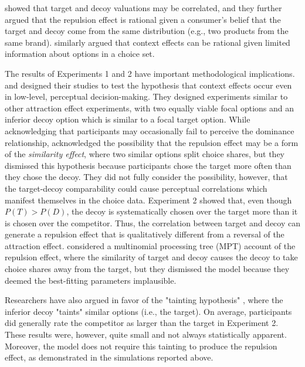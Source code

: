 \textcite{bhui2021rational} showed that target and decoy valuations may be correlated, and they further argued that the repulsion effect is rational given a consumer's belief that the target and decoy come from the same distribution (e.g., two products from the same brand). \textcite{bhui2024context} similarly argued that context effects can be rational given limited information about options in a choice set. 

The results of Experiments 1 and 2 have important methodological implications. \textcite{trueblood2013not} and \textcite{spektorWhenGoodLooks2018b} designed their studies to test the hypothesis that context effects occur even in low-level, perceptual decision-making. They designed experiments similar to other attraction effect experiments, with two equally viable focal options and an inferior decoy option which is similar to a focal target option. While acknowledging that participants may occasionally fail to perceive the dominance relationship, \textcite{spektorWhenGoodLooks2018b} acknowledged the possibility that the repulsion effect may be a form of the \textit{similarity effect}, where two similar options split choice shares, but they dismissed this hypothesis because participants chose the target more often than they chose the decoy. They did not fully consider the possibility, however, that the target-decoy comparability could cause perceptual correlations which manifest themselves in the choice data. Experiment 2 showed that, even though $P(T)>P(D)$, the decoy is systematically chosen over the target more than it is chosen over the competitor. Thus, the correlation between target and decoy can generate a repulsion effect that is qualitatively different from a reversal of the attraction effect. \textcite{spektorRepulsionEffectPreferential2022} considered a multinomial processing tree (MPT) account of the repulsion effect, where the similarity of target and decoy causes the decoy to take choice shares away from the target, but they dismissed the model because they deemed the best-fitting parameters implausible.

Researchers have also argued in favor of the "tainting hypothesis" \parencite{simonson2014vices,spektorWhenGoodLooks2018b}, where the inferior decoy "taints" similar options (i.e., the target). On average, participants did generally rate the competitor as larger than the target in Experiment 2. These results were, however, quite small and not always statistically apparent. Moreover, the model does not require this tainting to produce the repulsion effect, as demonstrated in the simulations reported above.

